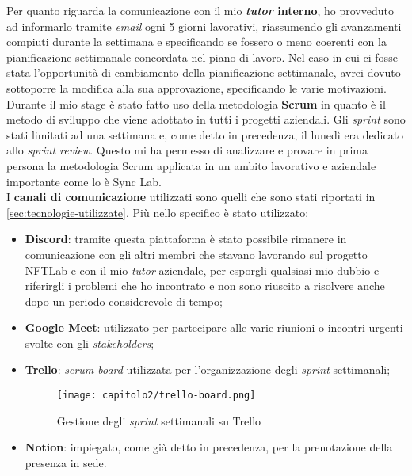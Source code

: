 Per quanto riguarda la comunicazione con il mio \textbf{\textit{tutor} interno}, ho provveduto ad informarlo tramite \textit{email} ogni 5 giorni lavorativi, riassumendo gli avanzamenti compiuti durante la settimana e specificando se fossero o meno coerenti con la pianificazione settimanale concordata nel piano di lavoro. Nel caso in cui ci fosse stata l'opportunità di cambiamento della pianificazione settimanale, avrei dovuto sottoporre la modifica alla sua approvazione, specificando le varie motivazioni. \\

Durante il mio stage è stato fatto uso della metodologia \textbf{Scrum} in quanto è il metodo di sviluppo che viene adottato in tutti i progetti aziendali. Gli \textit{sprint} sono stati limitati ad una settimana e, come detto in precedenza, il lunedì era dedicato allo \textit{sprint review}. Questo mi ha permesso di analizzare e provare in prima persona la metodologia Scrum applicata in un ambito lavorativo e aziendale importante come lo è Sync Lab. \\

I \textbf{canali di comunicazione} utilizzati sono quelli che sono stati riportati in \ref{sec:tecnologie-utilizzate}. Più nello specifico è stato utilizzato:
\begin{itemize}
  \item \textbf{Discord}: tramite questa piattaforma è stato possibile rimanere in comunicazione con gli altri membri che stavano lavorando sul progetto NFTLab e con il mio \textit{tutor} aziendale, per esporgli qualsiasi mio dubbio e riferirgli i problemi che ho incontrato e non sono riuscito a risolvere anche dopo un periodo considerevole di tempo;
  \item \textbf{Google Meet}: utilizzato per partecipare alle varie riunioni o incontri urgenti svolte con gli \textit{stakeholders};
  \item \textbf{Trello}: \textit{scrum board} utilizzata per l'organizzazione degli \textit{sprint} settimanali;
  
  \begin{figure}[!h]
    \centering
    \texttt{[image: capitolo2/trello-board.png]}
    \caption{Gestione degli \textit{sprint} settimanali su Trello}
  \end{figure}

  \item \textbf{Notion}: impiegato, come già detto in precedenza, per la prenotazione della presenza in sede.
\end{itemize}

